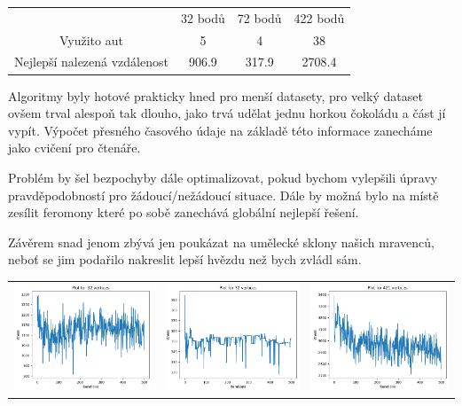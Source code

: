 \documentclass[a4paper]{article}
\newenvironment{ukol}[2][]{\begin{trivlist} 
\item[\hskip \labelsep {\bfseries #1}\hskip \labelsep {\bfseries #2}]}{\end{trivlist}}
\begin{document}
\begin{ukol}{Výsledky}
\begin{itemize}
	\item \begin{center}
		\begin{tabular}{ c c c c }
		  & 32 bodů & 72 bodů & 422 bodů \\ 
		 Využito aut & 5 & 4 & 38\\
		Nejlepší nalezená vzdálenost & 906.9 & 317.9 & 2708.4 \\
		\end{tabular}
	\item Algoritmy byly hotové prakticky hned pro menší datasety, pro velký dataset ovšem trval alespoň tak dlouho, jako trvá udělat jednu horkou čokoládu a část jí vypít. Výpočet přesného časového údaje na základě této informace zanecháme jako cvičení pro čtenáře.
	\item Problém by šel bezpochyby dále optimalizovat, pokud bychom vylepšili úpravy pravděpodobností pro žádoucí/nežádoucí situace. Dále by možná bylo na místě zesílit feromony které po sobě zanechává globální nejlepší řešení.
	\item Závěrem snad jenom zbývá jen poukázat na umělecké sklony našich mravenců, neboť se jim podařilo nakreslit lepší hvězdu než bych zvládl sám.
\end{center}
\end{itemize}
\begin{center}
		\begin{tabular}{ c c c }
		 \includegraphics[width=.33\linewidth]{./iterations_32} & \includegraphics[width=.33\linewidth]{./iterations_72} & \includegraphics[width=.33\linewidth]{./iterations_422} \\ 

\end{tabular}
\end{center}
\end{ukol}
\end{document}

